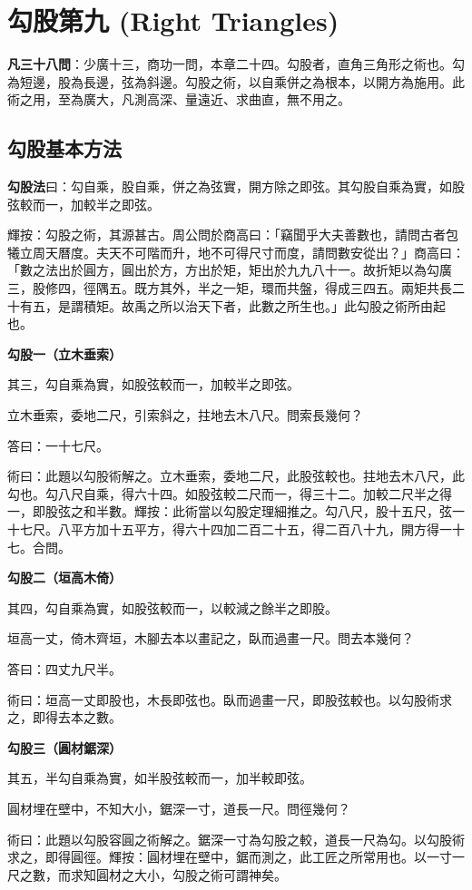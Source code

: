 \documentclass[11pt,a4paper]{article}
\newenvironment{problemenv}[1]{%
  \medskip\noindent\textbf{#1}\par\nopagebreak\smallskip
}{\medskip}
\begin{document}
\newpage
\section{勾股第九 (Right Triangles)}

\textbf{凡三十八問}：少廣十三，商功一問，本章二十四。勾股者，直角三角形之術也。勾為短邊，股為長邊，弦為斜邊。勾股之術，以自乘併之為根本，以開方為施用。此術之用，至為廣大，凡測高深、量遠近、求曲直，無不用之。

\subsection{勾股基本方法}

\textbf{勾股法}曰：勾自乘，股自乘，併之為弦實，開方除之即弦。其勾股自乘為實，如股弦較而一，加較半之即弦。

輝按：勾股之術，其源甚古。周公問於商高曰：「竊聞乎大夫善數也，請問古者包犧立周天曆度。夫天不可階而升，地不可得尺寸而度，請問數安從出？」商高曰：「數之法出於圓方，圓出於方，方出於矩，矩出於九九八十一。故折矩以為勾廣三，股修四，徑隅五。既方其外，半之一矩，環而共盤，得成三四五。兩矩共長二十有五，是謂積矩。故禹之所以治天下者，此數之所生也。」此勾股之術所由起也。

\begin{problemenv}{勾股一（立木垂索）}
其三，勾自乘為實，如股弦較而一，加較半之即弦。

立木垂索，委地二尺，引索斜之，拄地去木八尺。問索長幾何？

\textsf{答曰：}一十七尺。

\textsf{術曰：}此題以勾股術解之。立木垂索，委地二尺，此股弦較也。拄地去木八尺，此勾也。勾八尺自乘，得六十四。如股弦較二尺而一，得三十二。加較二尺半之得一，即股弦之和半數。輝按：此術當以勾股定理細推之。勾八尺，股十五尺，弦一十七尺。八平方加十五平方，得六十四加二百二十五，得二百八十九，開方得一十七。合問。
\end{problemenv}

\begin{problemenv}{勾股二（垣高木倚）}
其四，勾自乘為實，如股弦較而一，以較減之餘半之即股。

垣高一丈，倚木齊垣，木腳去本以畫記之，臥而過畫一尺。問去本幾何？

\textsf{答曰：}四丈九尺半。

\textsf{術曰：}垣高一丈即股也，木長即弦也。臥而過畫一尺，即股弦較也。以勾股術求之，即得去本之數。
\end{problemenv}

\begin{problemenv}{勾股三（圓材鋸深）}
其五，半勾自乘為實，如半股弦較而一，加半較即弦。

圓材埋在壁中，不知大小，鋸深一寸，道長一尺。問徑幾何？

\textsf{術曰：}此題以勾股容圓之術解之。鋸深一寸為勾股之較，道長一尺為勾。以勾股術求之，即得圓徑。輝按：圓材埋在壁中，鋸而測之，此工匠之所常用也。以一寸一尺之數，而求知圓材之大小，勾股之術可謂神矣。
\end{problemenv}
\end{document}

